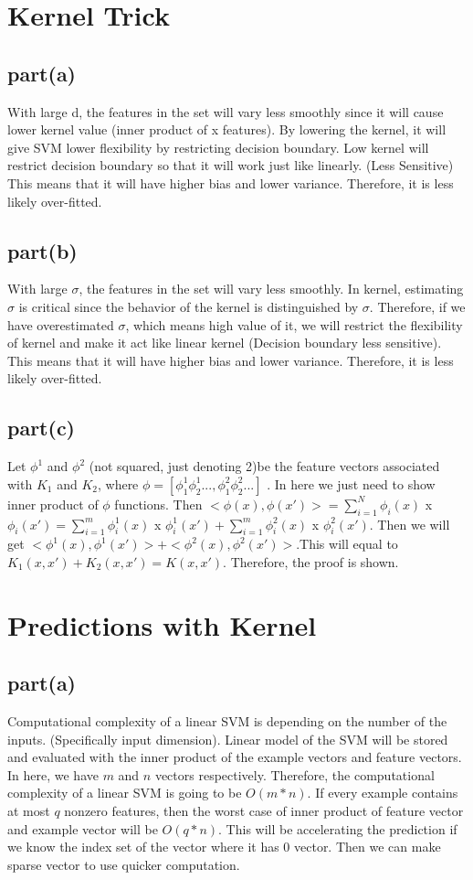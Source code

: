 \documentclass{article}
\begin{document}
\section{Kernel Trick}
\subsection{part(a)}
With large d, the features in the set will vary less smoothly since it will cause lower kernel value (inner product of x features). By lowering the kernel, it will give SVM lower flexibility by restricting decision boundary. Low kernel will restrict decision boundary so that it will work just like linearly. (Less Sensitive) This means that it will have higher bias and lower variance. Therefore, it is less likely over-fitted.
\subsection{part(b)}
With large $\sigma$, the features in the set will vary less smoothly. In kernel, estimating $\sigma$ is critical since the behavior of the kernel is distinguished by $\sigma$. Therefore, if we have overestimated $\sigma$, which means high value of it, we will restrict the flexibility of kernel and make it act like linear kernel (Decision boundary less sensitive). This means that it will have higher bias and lower variance. Therefore, it is less likely over-fitted.
\subsection{part(c)}
Let $\phi^1$ and $\phi^2$ (not squared, just denoting 2)be the feature vectors associated with $K_1$ and $K_2$, where $\phi = [\phi_1^1\phi_2^1...,\phi_1^2\phi_2^2...]$ . In here we just need to show inner product of $\phi$ functions. Then $<\phi(x), \phi(x')> = \sum_{i=1}^{N} \phi_i(x)$ x $\phi_i(x') = \sum_{i=1}^{m} \phi_i^1(x)$ x $\phi_i^1(x') + \sum_{i=1}^{m} \phi_i^2(x)$ x $\phi_i^2(x')$. Then we will get $<\phi^1(x),\phi^1(x')> + <\phi^2(x),\phi^2(x')>$.This will equal to $K_1(x,x') + K_2(x,x') = K(x,x')$. Therefore, the proof is shown.
\newpage
\section{Predictions with Kernel}
\subsection{part(a)}
Computational complexity of a linear SVM is depending on the number of the inputs. (Specifically input dimension). Linear model of the SVM will be stored and evaluated with the inner product of the example vectors and feature vectors. In here, we have $m$ and $n$ vectors respectively. Therefore, the computational complexity of a linear SVM is going to be $O(m*n)$. If every example contains at most $q$ nonzero features, then the worst case of inner product of feature vector and example vector will be $O(q*n)$. This will be accelerating the prediction if we know the index set of the vector where it has 0 vector. Then we can make sparse vector to use quicker computation.
\end{document}
